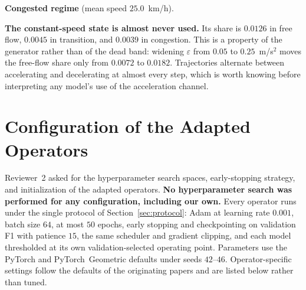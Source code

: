 \documentclass[journal]{IEEEtran}
\begin{document}
\vspace{1em}

\textbf{Congested regime} (mean speed $25.0$~km/h).

\begin{table}[!t]
  \caption{\textbf{[Realised frequencies, congested regime, anomaly-labelled rows excluded]}~ First-order transitions between kinematic states.}
  \label{tab:markov_cong}
  \centering
  \footnotesize
\end{table}


\vspace{1em}

\textbf{The constant-speed state is almost never used.} Its share is $0.0126$ in free flow, $0.0045$ in transition, and $0.0039$ in congestion. This is a property of the generator rather than of the dead band: widening $\varepsilon$ from $0.05$ to $0.25$~m/s$^2$ moves the free-flow share only from $0.0072$ to $0.0182$. Trajectories alternate between accelerating and decelerating at almost every step, which is worth knowing before interpreting any model's use of the acceleration channel.

\section{Configuration of the Adapted Operators}
\label{app:operators}
Reviewer~2 asked for the hyperparameter search spaces, early-stopping strategy, and initialization of the adapted operators. \textbf{No hyperparameter search was performed for any configuration, including our own.} Every operator runs under the single protocol of Section~\ref{sec:protocol}: Adam at learning rate $0.001$, batch size $64$, at most $50$ epochs, early stopping and checkpointing on validation F1 with patience $15$, the same scheduler and gradient clipping, and each model thresholded at its own validation-selected operating point. Parameters use the PyTorch and PyTorch~Geometric defaults under seeds $42$--$46$. Operator-specific settings follow the defaults of the originating papers and are listed below rather than tuned.
\end{document}
